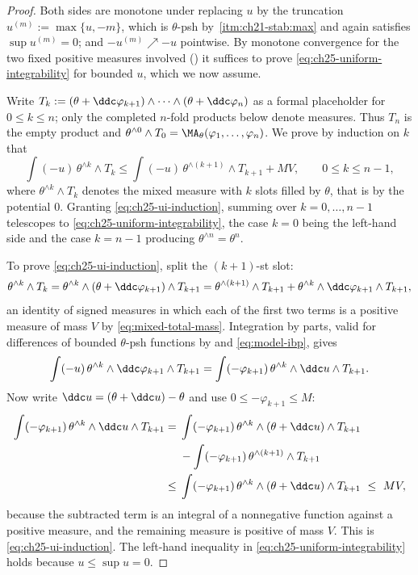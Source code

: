 \begin{proof}
Both sides are monotone under replacing $u$ by the truncation
$u^{(m)}:=\max\{u,-m\}$, which is $\theta$-psh by
\,\cref{itm:ch21-stab:max} and again satisfies
$\sup u^{(m)}=0$; and $-u^{(m)}\nearrow-u$ pointwise.  By monotone
convergence for the two fixed positive measures involved
() it suffices to prove
\eqref{eq:ch25-uniform-integrability} for bounded $u$, which we now assume.

Write $T_k:=(\theta+\ddc\varphi_{k+1})\wedge\cdots\wedge
(\theta+\ddc\varphi_n)$ as a formal placeholder for $0\leq k\leq n$;
only the completed $n$-fold products below denote measures.  Thus $T_n$ is the empty
product and $\theta^{\wedge0}\wedge T_0=\MA_\theta(\varphi_1,\ldots,
\varphi_n)$.  We prove by induction on $k$ that
\begin{equation}
\label{eq:ch25-ui-induction}
 \int(-u)\,\theta^{\wedge k}\wedge T_k
 \leq\int(-u)\,\theta^{\wedge(k+1)}\wedge T_{k+1}+MV ,
 \qquad 0\leq k\leq n-1 ,
\end{equation}
where $\theta^{\wedge k}\wedge T_k$ denotes the mixed measure with $k$
slots filled by $\theta$, that is by the potential $0$.  Granting
\eqref{eq:ch25-ui-induction}, summing over $k=0,\ldots,n-1$ telescopes to
\eqref{eq:ch25-uniform-integrability}, the case $k=0$ being the left-hand
side and the case $k=n-1$ producing $\theta^{\wedge n}=\theta^n$.

To prove \eqref{eq:ch25-ui-induction}, split the $(k+1)$-st slot:
\[
 \theta^{\wedge k}\wedge T_k
 =\theta^{\wedge k}\wedge(\theta+\ddc\varphi_{k+1})\wedge T_{k+1}
 =\theta^{\wedge(k+1)}\wedge T_{k+1}
  +\theta^{\wedge k}\wedge\ddc\varphi_{k+1}\wedge T_{k+1},
\]
an identity of signed measures in which each of the first two terms is a
positive measure of mass $V$ by \eqref{eq:mixed-total-mass}.  Integration
by parts, valid for differences of bounded $\theta$-psh functions by
 and \eqref{eq:model-ibp}, gives
\[
 \int(-u)\,\theta^{\wedge k}\wedge\ddc\varphi_{k+1}\wedge T_{k+1}
 =\int(-\varphi_{k+1})\,\theta^{\wedge k}\wedge\ddc u\wedge T_{k+1}.
\]
Now write $\ddc u=(\theta+\ddc u)-\theta$ and use
$0\leq-\varphi_{k+1}\leq M$:
\[
\begin{split}
 \int(-\varphi_{k+1})\,\theta^{\wedge k}\wedge\ddc u\wedge T_{k+1}
 ={}&\int(-\varphi_{k+1})\,
     \theta^{\wedge k}\wedge(\theta+\ddc u)\wedge T_{k+1}\\
    &-\int(-\varphi_{k+1})\,\theta^{\wedge(k+1)}\wedge T_{k+1}\\
 \leq{}&\int(-\varphi_{k+1})\,
     \theta^{\wedge k}\wedge(\theta+\ddc u)\wedge T_{k+1}
 \ \leq\ MV,
\end{split}
\]
because the subtracted term is an integral of a nonnegative function against
a positive measure, and the remaining measure is positive of mass $V$.
This is \eqref{eq:ch25-ui-induction}.  The left-hand inequality in
\eqref{eq:ch25-uniform-integrability} holds because $u\leq\sup u=0$.
\end{proof}

